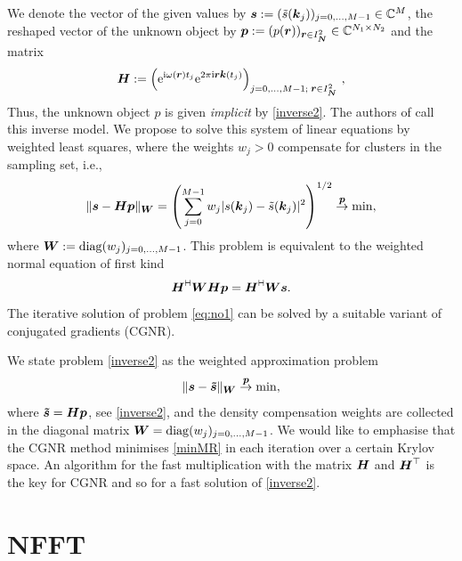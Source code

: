 \documentclass[journal]{IEEEtran}
\def\ti{\mbox{\scriptsize{\rm i}}}
\newcommand{\eip}[1]{{\rm e}^{ 2\pi{\ti} #1}}
\newcommand{\zb}[1]{\mbox{\boldmath{${#1}$}}}
\newcommand{\zbs}[1]{\mbox{\boldmath\scriptsize{${#1}$}}}
\newcommand{\zbss}[1]{\mbox{\boldmath\tiny{${#1}$}}}
\newcommand{\diag}{{\rm diag}}
\newcommand{\adj}{{\vdash \hspace*{-1.72mm} \dashv}}
\numberwithin{equation}{section}
\numberwithin{table}{section}
\numberwithin{figure}{section}
\begin{document}
We denote the vector of the given values by $\zb {s}:=(\tilde s({\zb k_j}))_{j=0,\ldots,M-1}\in \mathbb{C}^{M}$,
the reshaped vector of the unknown object by $\zb {p}:=(p({\zb r}))_{\zbs r\in I_{\zbss N}^2} \in
\mathbb{C}^{N_1\times N_2}$ and the matrix 
\begin{equation}\label{MatrixB}
\zb H:=\left({\rm e}^{{\rm\scriptsize i}\omega(\zbs r)t_j} \eip{\zbs r\zbs k(t_j)}\right)_{j=0,\hdots,M-1;\;\zbs r\in
  I_{\zbss N}^2}\, ,
\end{equation}
Thus, the unknown object $p$ is given {\em implicit} by \eqref{inverse2}.
The authors of \cite{DeWaLe02} call this inverse model.
We propose to solve this system of linear equations by weighted least
squares, where the 
weights $w_j> 0$ compensate for clusters in the sampling set, i.e.,
\begin{equation} \label{eq:min}
  \|\zb s - \zb H \zb  p\|_{\zbs W}
  = \left(\sum_{j=0}^{M-1} w_j |s(\zb k_j)-\tilde s(\zb k_j)|^2\right)^{1/2}
  \stackrel{\zbs p}{\rightarrow} \min,
\end{equation}
where $\zb W:=\diag(w_j)_{j=0,\ldots,M-1}$.
This problem is equivalent to the weighted normal equation of first kind
\begin{equation}
  \label{eq:no1}
  \zb H^{\adj} \zb W \zb H \zb p = \zb H^{\adj} \zb W \zb s.
\end{equation}
The iterative solution of problem \eqref{eq:no1} can be solved 
by a suitable variant of conjugated gradients (CGNR). 

We state problem \eqref{inverse2} as the weighted approximation problem
\begin{equation}\label{minMR}
  \|\zb s - \zb {\tilde s}\|_{\zbs W}
  \stackrel{\zbs {p}}{\rightarrow} \min,
\end{equation}
where $\zb {\tilde s}=\zb H\zb p$, see \eqref{inverse2}, and the density compensation weights are collected in the diagonal matrix
$\zb W=\diag(w_j)_{j=0,\ldots,M-1}$. 
We would like to emphasise that the CGNR method minimises \eqref{minMR} in each iteration over a certain Krylov space.
An algorithm for the fast multiplication with the matrix $\zb H$ and
$\zb H^{\top}$  is the key for CGNR and so for a fast solution of \eqref{inverse2}.

\section{NFFT}\label{Sec:NFFT}
\end{document}
